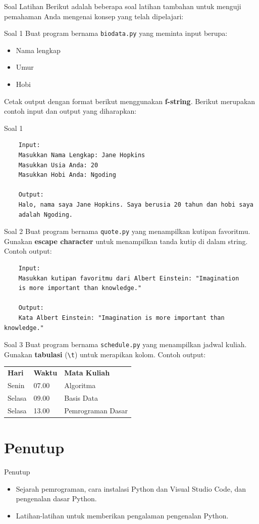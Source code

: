 \documentclass[aspectratio=169, table]{beamer}
\begin{document}
\begin{frame}[fragile]{Soal Latihan}
	Berikut adalah beberapa soal latihan tambahan untuk menguji pemahaman Anda mengenai konsep yang telah dipelajari:
\end{frame}

\begin{frame}{Soal 1}
	Buat program bernama \texttt{biodata.py} yang meminta input berupa:
	\begin{itemize}
		\item Nama lengkap
		\item Umur
		\item Hobi
	\end{itemize}
	Cetak output dengan format berikut menggunakan \textbf{f-string}. Berikut merupakan contoh input dan output yang diharapkan:
\end{frame}

\begin{frame}[fragile]{Soal 1}
	\begin{verbatim}
	Input:
	Masukkan Nama Lengkap: Jane Hopkins
	Masukkan Usia Anda: 20
	Masukkan Hobi Anda: Ngoding

	Output:
	Halo, nama saya Jane Hopkins. Saya berusia 20 tahun dan hobi saya 
	adalah Ngoding.
	\end{verbatim}
\end{frame}

\begin{frame}[fragile]{Soal 2}
	Buat program bernama \texttt{quote.py} yang menampilkan kutipan favoritmu. Gunakan \textbf{escape character} untuk menampilkan tanda kutip di dalam string. Contoh output:

	\begin{verbatim}
	Input:
	Masukkan kutipan favoritmu dari Albert Einstein: "Imagination 
	is more important than knowledge."

	Output:
	Kata Albert Einstein: "Imagination is more important than knowledge."
	\end{verbatim}
\end{frame}

\begin{frame}{Soal 3}
	Buat program bernama \texttt{schedule.py} yang menampilkan jadwal kuliah. Gunakan \textbf{tabulasi} (\texttt{\textbackslash t}) untuk merapikan kolom. Contoh output:
	\\[15pt]
	\begin{tabular}{l l l}
		\textbf{Hari} & \textbf{Waktu} & \textbf{Mata Kuliah} \\
		Senin & 07.00 & Algoritma \\
		Selasa & 09.00 & Basis Data \\
		Selasa & 13.00 & Pemrograman Dasar \\
	\end{tabular}
\end{frame}

\section{Penutup}
\begin{frame}[fragile]{Penutup}
\begin{itemize}
\item Sejarah pemrograman, cara instalasi Python dan Visual Studio Code, dan pengenalan dasar Python.
\item Latihan-latihan untuk memberikan pengalaman pengenalan Python.
\end{itemize}
\end{frame}
\end{document}
